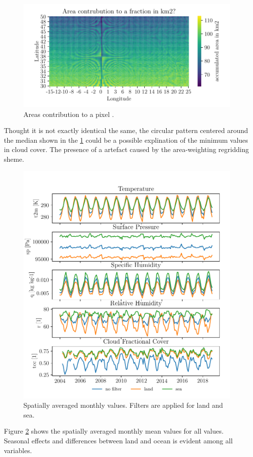 \begin{figure}[ht]
    \centering
    \includegraphics{python_figs/signal_area_pixel.pdf}
    \caption{Areas contribution to a pixel .}
    \label{fig:area_pixel_signal}
\end{figure}
Thought it is not exactly identical the same, the circular pattern centered around the median shown in the \ref{fig:area_pixel_signal} could be a possible explination of the minimum values in cloud cover. The presence of a artefact caused by the area-weighting regridding sheme.

\begin{figure}[ht]
    \centering
    \includegraphics{python_figs/monthly_means.pdf}
    \caption{Spatially averaged monthly values. Filters are applied for land and sea.}
    \label{fig:monthly_mean_ts_vars}
\end{figure}
Figure \ref{fig:monthly_mean_ts_vars} shows the spatially averaged monthly mean values for all values. Seasonal effects and differences between land and ocean is evident among all variables.


